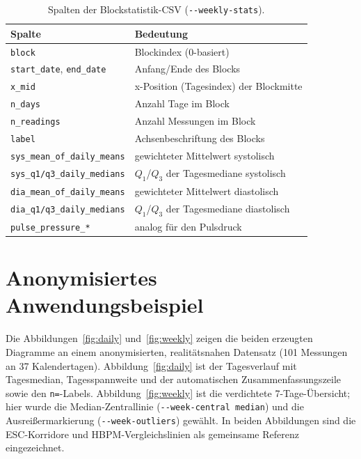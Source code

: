 \documentclass[conference]{IEEEtran}
\newcommand{\param}[1]{\texttt{#1}}
\begin{document}
\begin{table}[!t]
\caption{Spalten der Blockstatistik-CSV (\texttt{-{}-weekly-stats}).}
\label{tab:weekly_cols}
\centering
\footnotesize
\renewcommand{\arraystretch}{1.15}
\begin{tabular}{>{\raggedright\arraybackslash}p{} >{\raggedright\arraybackslash}p{}}
\toprule
\textbf{Spalte} & \textbf{Bedeutung} \\
\midrule
\texttt{block} & Blockindex (0-basiert) \\
\texttt{start\_date}, \texttt{end\_date} & Anfang/Ende des Blocks \\
\texttt{x\_mid} & x-Position (Tagesindex) der Blockmitte \\
\texttt{n\_days} & Anzahl Tage im Block \\
\texttt{n\_readings} & Anzahl Messungen im Block \\
\texttt{label} & Achsenbeschriftung des Blocks \\
\texttt{sys\_mean\_of\_daily\_means} & gewichteter Mittelwert systolisch \\
\texttt{sys\_q1/q3\_daily\_medians} & $Q_1$/$Q_3$ der Tagesmediane systolisch \\
\texttt{dia\_mean\_of\_daily\_means} & gewichteter Mittelwert diastolisch \\
\texttt{dia\_q1/q3\_daily\_medians} & $Q_1$/$Q_3$ der Tagesmediane diastolisch \\
\texttt{pulse\_pressure\_*} & analog für den Pulsdruck \\
\bottomrule
\end{tabular}
\end{table}

\section{Anonymisiertes Anwendungsbeispiel}
Die Abbildungen~\ref{fig:daily} und~\ref{fig:weekly} zeigen die beiden
erzeugten Diagramme an einem anonymisierten, realitätsnahen Datensatz
(101 Messungen an 37 Kalendertagen). Abbildung~\ref{fig:daily} ist der
Tagesverlauf mit Tagesmedian, Tagesspannweite und der automatischen
Zusammenfassungszeile sowie den \texttt{n=}-Labels.
Abbildung~\ref{fig:weekly} ist die verdichtete 7-Tage-Übersicht; hier wurde die
Median-Zentrallinie (\param{-{}-week-central median}) und die
Ausreißermarkierung (\param{-{}-week-outliers}) gewählt. In beiden Abbildungen
sind die ESC-Korridore und HBPM-Vergleichslinien als gemeinsame Referenz
eingezeichnet.
\end{document}
